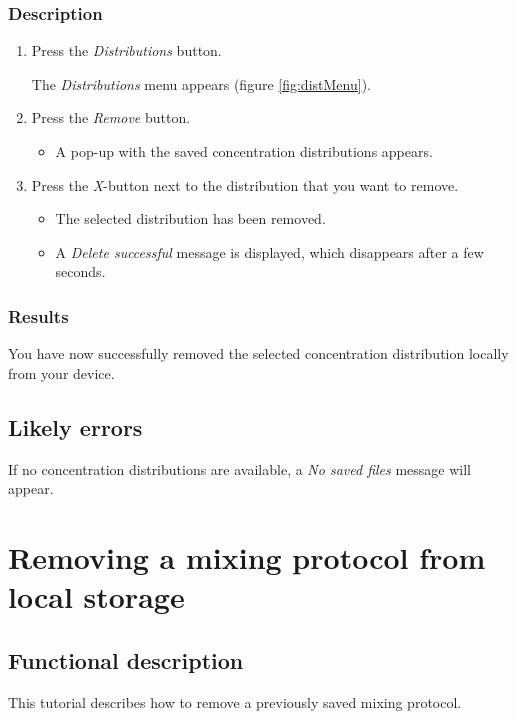 \subsubsection{Description}
\begin{enumerate}
	\item Press the \emph{Distributions} button.
		\begin{itemize}
			The \emph{Distributions} menu appears (figure \ref{fig:distMenu}).
		\end{itemize}
	\item Press the \emph{Remove} button.
		\begin{itemize}
			\item A pop-up with the saved concentration distributions appears.
		\end{itemize}
	\item Press the \emph{X}-button next to the distribution that you want to remove.
		\begin{itemize}
			\item The selected distribution has been removed.
			\item A \emph{Delete successful} message is displayed, which disappears after a few seconds.
		\end{itemize}
\end{enumerate}

\subsubsection{Results}
You have now successfully removed the selected concentration distribution locally from your device.

\subsection{Likely errors}
If no concentration distributions are available, a \emph{No saved files} message will appear.

\section{Removing a mixing protocol from local storage}
\label{sec:remmixprot}

\subsection{Functional description}
This tutorial describes how to remove a previously saved mixing protocol.

